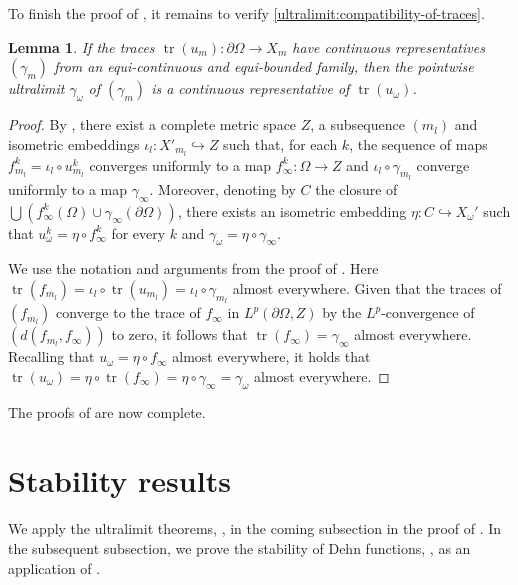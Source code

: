 \documentclass[a4paper,leqno]{amsart}
\numberwithin{equation}{section}
\newtheorem{lemma}[theorem]{Lemma}
\theoremstyle{remark}
\theoremstyle{remark}
\DeclareMathOperator{\trace}{tr}
\begin{document}
To finish the proof of , it remains to verify \eqref{ultralimit:compatibility-of-traces}.
\begin{lemma}
If the traces $\trace(u_m) \colon \partial \Omega \to X_m$ have continuous representatives $( \gamma_m )$ from an equi-continuous and equi-bounded family, then the pointwise ultralimit $\gamma_\omega$ of $( \gamma_m )$ is a continuous representative of $\trace( u_\omega )$.
\end{lemma}
\begin{proof}
    By , there exist a complete metric space $Z$, a subsequence $(m_l)$ and isometric embeddings $\iota_l\colon X'_{m_l}\hookrightarrow Z$ such that, for each $k$, the sequence of maps $f_{m_l}^{k} = \iota_l\circ u_{m_l}^k$ converges uniformly to a map $f_\infty^k\colon \Omega\to Z$ and $\iota_l \circ \gamma_{m_l}$ converge uniformly to a map $\gamma_\infty$. Moreover, denoting by $C$ the closure of $\bigcup ( f_\infty^k(\Omega) \cup \gamma_{\infty}(\partial \Omega) )$, there exists an isometric embedding $\eta\colon C\hookrightarrow X_\omega'$ such that $u_\omega^k = \eta\circ f_\infty^k$ for every $k$ and $\gamma_\omega = \eta \circ \gamma_\infty$.

    We use the notation and arguments from the proof of . Here $\trace( f_{m_l} ) = \iota_l \circ \trace( u_{m_l} ) = \iota_l \circ \gamma_{m_l}$ almost everywhere. Given that the traces of $( f_{m_l} )$ converge to the trace of $f_\infty$ in $L^{p}( \partial \Omega, Z )$ by the $L^p$-convergence of $( d( f_{m_l}, f_\infty ) )$ to zero, it follows that $\trace( f_\infty ) = \gamma_\infty$ almost everywhere. Recalling that $u_\omega = \eta \circ f_\infty$ almost everywhere, it holds that $\trace(u_\omega) = \eta \circ \trace( f_\infty ) = \eta \circ \gamma_\infty = \gamma_\omega$ almost everywhere.
\end{proof}
The proofs of  are now complete.

\section{Stability results}\label{section-stability-results}
We apply the ultralimit theorems, , in the coming subsection in the proof of . In the subsequent subsection, we prove the stability of Dehn functions, , as an application of .
\end{document}

